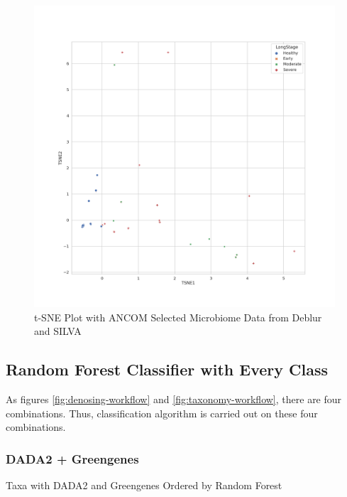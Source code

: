\documentclass[a4paper]{article}
\begin{document}
            \begin{figure}[p]
                \centering
                \includegraphics[width=0.6 \linewidth]{figures/tSNE/ANCOM/ANCOM.Deblur.silva.png}
                \caption{t-SNE Plot with ANCOM Selected Microbiome Data from Deblur and SILVA}
                \label{fig:tsne-ANCOM-deblur-silva}
            \end{figure}

        \subsection{Random Forest Classifier with Every Class}
            As figures \ref{fig:denosing-workflow} and \ref{fig:taxonomy-workflow}, there are four combinations. Thus, classification algorithm is carried out on these four combinations.

            \subsubsection{DADA2 + Greengenes}

                \begin{table}[p]
                    \centering
                    \caption{Taxa with DADA2 and Greengenes Ordered by Random Forest}
                    \label{tb:RF-whole-dada2-gg}

                \end{table}
\end{document}

